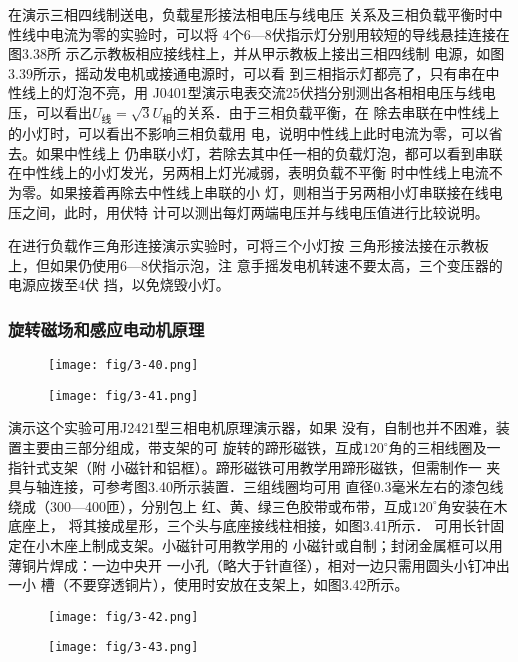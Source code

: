 在演示三相四线制送电，负载星形接法相电压与线电压
关系及三相负载平衡时中性线中电流为零的实验时，可以将
4个6—8伏指示灯分别用较短的导线悬挂连接在图3.38所
示乙示教板相应接线柱上，并从甲示教板上接出三相四线制
电源，如图3.39所示，摇动发电机或接通电源时，可以看
到三相指示灯都亮了，只有串在中性线上的灯泡不亮，用
J0401型演示电表交流25伏挡分别测出各相相电压与线电
压，可以看出$U_{\text{线}}=\sqrt{3}U_{\text{相}}$的关系．由于三相负载平衡，在
除去串联在中性线上的小灯时，可以看出不影响三相负载用
电，说明中性线上此时电流为零，可以省去。如果中性线上
仍串联小灯，若除去其中任一相的负载灯泡，都可以看到串联
在中性线上的小灯发光，另两相上灯光减弱，表明负载不平衡
时中性线上电流不为零。如果接着再除去中性线上串联的小
灯，则相当于另两相小灯串联接在线电压之间，此时，用伏特
计可以测出每灯两端电压并与线电压值进行比较说明。

在进行负载作三角形连接演示实验时，可将三个小灯按
三角形接法接在示教板上，但如果仍使用6—8伏指示泡，注
意手摇发电机转速不要太高，三个变压器的电源应拨至4伏
挡，以免烧毁小灯。

\subsubsection{旋转磁场和感应电动机原理}

\begin{figure}[htp]\centering
    \begin{minipage}[t]{0.48\textwidth}
    \centering
\texttt{[image: fig/3-40.png]}
    \caption{}
    \end{minipage}
    \begin{minipage}[t]{0.48\textwidth}
    \centering
\texttt{[image: fig/3-41.png]}
    \caption{}
    \end{minipage}
    \end{figure}

演示这个实验可用J2421型三相电机原理演示器，如果
没有，自制也并不困难，装置主要由三部分组成，带支架的可
旋转的蹄形磁铁，互成$120^{\circ}$角的三相线圈及一指针式支架（附
小磁针和铝框）。蹄形磁铁可用教学用蹄形磁铁，但需制作一
夹具与轴连接，可参考图3.40所示装置．三组线圈均可用
直径0.3毫米左右的漆包线绕成（300—400匝），分别包上
红、黄、绿三色胶带或布带，互成$120^{\circ}$角安装在木底座上，
将其接成星形，三个头与底座接线柱相接，如图3.41所示．
可用长针固定在小木座上制成支架。小磁针可用教学用的
小磁针或自制；封闭金属框可以用薄铜片焊成：一边中央开
一小孔（略大于针直径），相对一边只需用圆头小钉冲出一小
槽（不要穿透铜片），使用时安放在支架上，如图3.42所示。

\begin{figure}[htp]\centering
    \begin{minipage}[t]{0.48\textwidth}
    \centering
\texttt{[image: fig/3-42.png]}
    \caption{}
    \end{minipage}
    \begin{minipage}[t]{0.48\textwidth}
    \centering
\texttt{[image: fig/3-43.png]}
    \caption{}
    \end{minipage}
    \end{figure}

